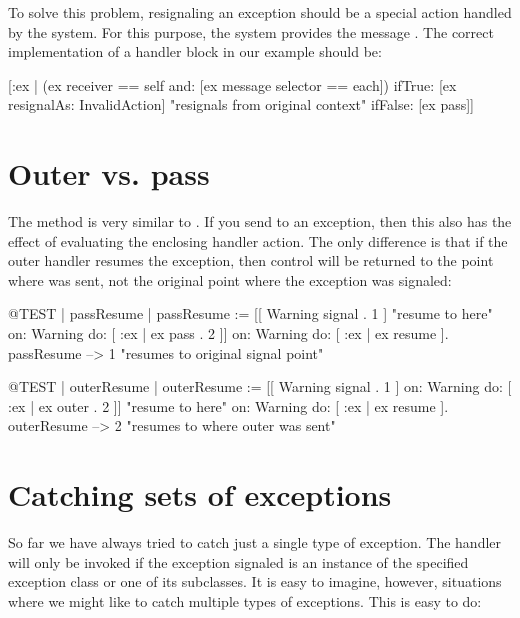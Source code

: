 \documentclass[a4paper,10pt,twoside]{book}
\begin{document}
To solve this problem, resignaling an exception should be a special action handled by the system. For this purpose, the system provides the message . The correct implementation of a handler block in our  example should be:

\begin{code}{}
 [:ex |  (ex receiver == self and: [ex message selector == each])
	ifTrue: [ex resignalAs: InvalidAction]    "resignals from original context"
	ifFalse: [ex pass]]
\end{code}

\section{Outer vs. pass}

The method  is very similar to . If you send  to an exception, then this also has the effect of evaluating the enclosing handler action. The only difference is that if the outer handler resumes the exception, then control will be returned to the point where  was sent, not the original point where the exception was signaled:

\begin{code}{@TEST | passResume |}
passResume := [[ Warning signal . 1 ]    "resume to here"
	on: Warning
	do: [ :ex | ex pass . 2 ]]
		on: Warning
		do: [ :ex | ex resume ].
passResume --> 1    "resumes to original signal point"
\end{code}


\begin{code}{@TEST | outerResume |}
outerResume := [[ Warning signal . 1 ]
	on: Warning
	do: [ :ex | ex outer . 2 ]]    "resume to here"
		on: Warning
		do: [ :ex | ex resume ].
outerResume --> 2    "resumes to where outer was sent"
\end{code}

\section{Catching sets of exceptions}

So far we have always tried to catch just a single type of exception. The handler will only be invoked if the exception signaled is an instance of the specified exception class or one of its subclasses. It is easy to imagine, however, situations where we might like to catch multiple types of exceptions. This is easy to do:
\end{document}
